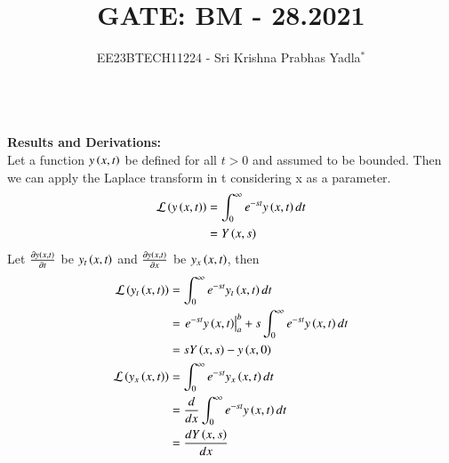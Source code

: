 \documentclass[journal,12pt,twocolumn]{IEEEtran}
\theoremstyle{remark}
\begin{document}

\vspace{3cm}

\title{GATE: BM - 28.2021}
\author{EE23BTECH11224 - Sri Krishna Prabhas Yadla$^{*}$%
}
\maketitle
\newpage
\bigskip

\renewcommand{\thefigure}{\arabic{figure}}
\renewcommand{\thetable}{\arabic{table}}


\vspace{3cm}
\\
\textbf{Results and Derivations:}
\\
Let a function $y\left(x,t\right)$ be defined for all $t>0$ and assumed to be bounded. Then we can apply the Laplace transform in t considering x as a parameter.
\begin{align}
 \mathcal{L}\left(y\left(x,t\right)\right) &= \int_{0}^{\infty}e^{-st}y\left(x,t\right)dt\\
 &= Y\left(x,s\right)
\end{align}
Let $\frac{\partial y\left(x,t\right)}{\partial t}$ be $y_t\left(x,t\right)$ and $\frac{\partial y\left(x,t\right)}{\partial x}$ be $y_x\left(x,t\right)$, then
\begin{align}
 \mathcal{L}\left(y_t\left(x,t\right)\right) &= \int_{0}^{\infty}e^{-st}y_t\left(x,t\right)dt\\
 &= \left. e^{-st}y\left(x,t\right)\right|_{a}^{b} + s\int_{0}^{\infty}e^{-st} y\left(x,t\right) dt\\
 &= sY\left(x,s\right) - y\left(x,0\right) \label{L(y_t(x,t))}\\
 \mathcal{L}\left(y_x\left(x,t\right)\right) &= \int_{0}^{\infty}e^{-st}y_x\left(x,t\right)dt\\
 &= \frac{d}{dx}\int_{0}^{\infty}e^{-st}y\left(x,t\right)dt \label{L(y_x(x,t))}\\
 &= \frac{dY\left(x,s\right)}{dx}
\end{align}
\end{document}
